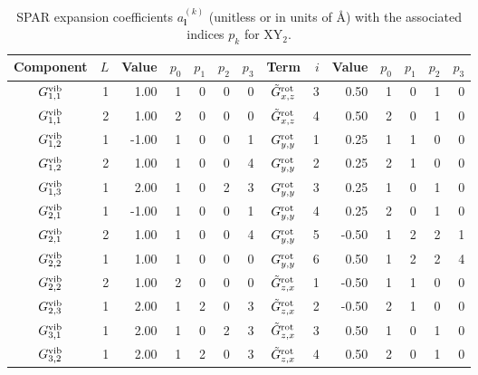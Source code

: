 \begin{table}[h]
    \centering
    \footnotesize
    \caption{SPAR expansion coefficients $a^{(k)}_{\bm{l}}$ (unitless or in units of \AA) with the associated indices $p_k$ for XY$_2$. }
        \label{table:KEO:XY2:vib}
    \begin{tabular}{crrrrrrcrrrrrr}
    \hline
    \hline
        Component  & $L$ & Value & ${p}_0$ & ${p}_1$ & ${p}_2$ & ${p}_3$ & Term  & $i$ & Value & ${p}_0$ & ${p}_1$ & ${p}_2$ & ${p}_3$ \\
    \hline
$  G^{\rm vib}_{    1,  1}$   &   1  &  1.00 & 1 & 0 & 0 & 0  &  $  \tilde{G}^{\rm rot}_{     x,  z}$   &    3  &  0.50 & 1 & 0 & 1 & 0 \\
$  G^{\rm vib}_{    1,  1}$   &   2  &  1.00 & 2 & 0 & 0 & 0  &  $  \tilde{G}^{\rm rot}_{     x,  z}$   &    4  &  0.50 & 2 & 0 & 1 & 0 \\
$  G^{\rm vib}_{    1,  2}$   &   1  & -1.00 & 1 & 0 & 0 & 1  &  $  G^{\rm rot}_{     y,  y}$   &    1  &  0.25 & 1 & 1 & 0 & 0 \\
$  G^{\rm vib}_{    1,  2}$   &   2  &  1.00 & 1 & 0 & 0 & 4  &  $  G^{\rm rot}_{     y,  y}$   &    2  &  0.25 & 2 & 1 & 0 & 0 \\
$  G^{\rm vib}_{    1,  3}$   &   1  &  2.00 & 1 & 0 & 2 & 3  &  $  G^{\rm rot}_{     y,  y}$   &    3  &  0.25 & 1 & 0 & 1 & 0 \\
$  G^{\rm vib}_{    2,  1}$   &   1  & -1.00 & 1 & 0 & 0 & 1  &  $  G^{\rm rot}_{     y,  y}$   &    4  &  0.25 & 2 & 0 & 1 & 0 \\
$  G^{\rm vib}_{    2,  1}$   &   2  &  1.00 & 1 & 0 & 0 & 4  &  $  G^{\rm rot}_{     y,  y}$   &    5  & -0.50 & 1 & 2 & 2 & 1 \\
$  G^{\rm vib}_{    2,  2}$   &   1  &  1.00 & 1 & 0 & 0 & 0  &  $  G^{\rm rot}_{     y,  y}$   &    6  &  0.50 & 1 & 2 & 2 & 4 \\
$  G^{\rm vib}_{    2,  2}$   &   2  &  1.00 & 2 & 0 & 0 & 0  &  $  \tilde{G}^{\rm rot}_{     z,  x}$   &    1  & -0.50 & 1 & 1 & 0 & 0 \\
$  G^{\rm vib}_{    2,  3}$   &   1  &  2.00 & 1 & 2 & 0 & 3  &  $  \tilde{G}^{\rm rot}_{     z,  x}$   &    2  & -0.50 & 2 & 1 & 0 & 0 \\
$  G^{\rm vib}_{    3,  1}$   &   1  &  2.00 & 1 & 0 & 2 & 3  &  $  \tilde{G}^{\rm rot}_{     z,  x}$   &    3  &  0.50 & 1 & 0 & 1 & 0 \\
$  G^{\rm vib}_{    3,  2}$   &   1  &  2.00 & 1 & 2 & 0 & 3  &  $  \tilde{G}^{\rm rot}_{     z,  x}$   &    4  &  0.50 & 2 & 0 & 1 & 0 \\

\end{tabular}
\end{table}
